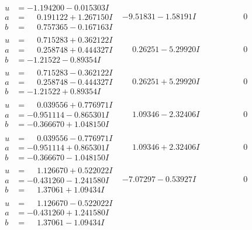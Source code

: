 \documentclass[1p]{elsarticle_modified}
\theoremstyle{definition}
\begin{document}
$$\begin{array}{c|c|c}
\begin{aligned}
u &= -1.194200 - 0.015303 I \\
a &= \phantom{-}0.191122 + 1.267150 I \\
b &= \phantom{-}0.757365 - 0.167163 I\end{aligned}
 & -9.51831 - 1.58191 I & \phantom{-0.000000 } 0 \\ \hline\begin{aligned}
u &= \phantom{-}0.715283 + 0.362122 I \\
a &= \phantom{-}0.258748 + 0.444327 I \\
b &= -1.21522 - 0.89354 I\end{aligned}
 & \phantom{-}0.26251 - 5.29920 I & \phantom{-0.000000 } 0 \\ \hline\begin{aligned}
u &= \phantom{-}0.715283 - 0.362122 I \\
a &= \phantom{-}0.258748 - 0.444327 I \\
b &= -1.21522 + 0.89354 I\end{aligned}
 & \phantom{-}0.26251 + 5.29920 I & \phantom{-0.000000 } 0 \\ \hline\begin{aligned}
u &= \phantom{-}0.039556 + 0.776971 I \\
a &= -0.951114 - 0.865301 I \\
b &= -0.366670 + 1.048150 I\end{aligned}
 & \phantom{-}1.09346 - 2.32406 I & \phantom{-0.000000 } 0 \\ \hline\begin{aligned}
u &= \phantom{-}0.039556 - 0.776971 I \\
a &= -0.951114 + 0.865301 I \\
b &= -0.366670 - 1.048150 I\end{aligned}
 & \phantom{-}1.09346 + 2.32406 I & \phantom{-0.000000 } 0 \\ \hline\begin{aligned}
u &= \phantom{-}1.126670 + 0.522022 I \\
a &= -0.431260 - 1.241580 I \\
b &= \phantom{-}1.37061 + 1.09434 I\end{aligned}
 & -7.07297 - 0.53927 I & \phantom{-0.000000 } 0 \\ \hline\begin{aligned}
u &= \phantom{-}1.126670 - 0.522022 I \\
a &= -0.431260 + 1.241580 I \\
b &= \phantom{-}1.37061 - 1.09434 I\end{aligned}

\end{array}$$
\end{document}
